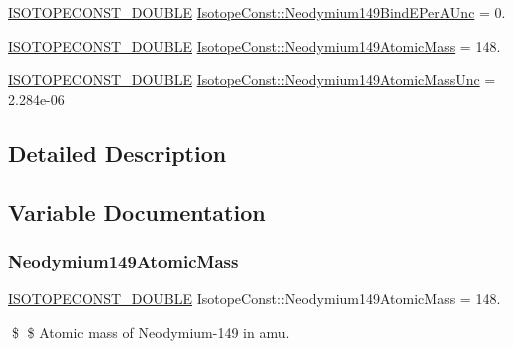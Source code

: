 \begin{DoxyCompactItemize}
\mbox{\hyperlink{group___isotope_const-_macros_ga8f45a7272ce02c0b4c65c44636ed719a}{I\+S\+O\+T\+O\+P\+E\+C\+O\+N\+S\+T\+\_\+\+D\+O\+U\+B\+LE}} \mbox{\hyperlink{group___isotope_const-_neodymium-_nd149_ga56cf7fa94e98f03c90a071d4c2888714}{Isotope\+Const\+::\+Neodymium149\+Bind\+E\+Per\+A\+Unc}} = 0.
\item 
\mbox{\hyperlink{group___isotope_const-_macros_ga8f45a7272ce02c0b4c65c44636ed719a}{I\+S\+O\+T\+O\+P\+E\+C\+O\+N\+S\+T\+\_\+\+D\+O\+U\+B\+LE}} \mbox{\hyperlink{group___isotope_const-_neodymium-_nd149_gae22e93b652a26b1f93c61b5f89c0e574}{Isotope\+Const\+::\+Neodymium149\+Atomic\+Mass}} = 148.
\item 
\mbox{\hyperlink{group___isotope_const-_macros_ga8f45a7272ce02c0b4c65c44636ed719a}{I\+S\+O\+T\+O\+P\+E\+C\+O\+N\+S\+T\+\_\+\+D\+O\+U\+B\+LE}} \mbox{\hyperlink{group___isotope_const-_neodymium-_nd149_ga22020b7af075a081be677930d67281e2}{Isotope\+Const\+::\+Neodymium149\+Atomic\+Mass\+Unc}} = 2.\+284e-\/06
\end{DoxyCompactItemize}


\subsection{Detailed Description}


\subsection{Variable Documentation}
\mbox{\label{group___isotope_const-_neodymium-_nd149_gae22e93b652a26b1f93c61b5f89c0e574}} 
\subsubsection{\texorpdfstring{Neodymium149\+Atomic\+Mass}{Neodymium149AtomicMass}}
{\footnotesize\ttfamily \mbox{\hyperlink{group___isotope_const-_macros_ga8f45a7272ce02c0b4c65c44636ed719a}{I\+S\+O\+T\+O\+P\+E\+C\+O\+N\+S\+T\+\_\+\+D\+O\+U\+B\+LE}} Isotope\+Const\+::\+Neodymium149\+Atomic\+Mass = 148.}

\$ \$ Atomic mass of Neodymium-\/149 in amu. \mbox{\label{group___isotope_const-_neodymium-_nd149_ga22020b7af075a081be677930d67281e2}} 
